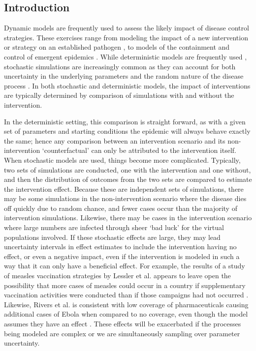 \documentclass[PTRSB]{rsos}
\begin{document}
\begin{multicols}{2}
\section{Introduction}
Dynamic models are frequently used to assess the likely impact of disease control strategies.
These exercises range from modeling the impact of a new intervention or strategy on an established pathogen \cite{azman-et-al:2016}, to models of the containment and control of emergent epidemics \cite{lessler-et-al:2016}.
While deterministic models are frequently used \cite{fraser-et-al:2004}, stochastic simulations are increasingly common as they can account for both uncertainty in the underlying parameters and the random nature of the disease process \cite{ferguson-et-al:2003}.
In both stochastic and deterministic models, the impact of interventions are typically determined by comparison of simulations with and without the intervention.

In the deterministic setting, this comparison is straight forward, as with a given set of parameters and starting conditions the epidemic will always behave exactly the same; hence any comparison between an intervention scenario and its non-intervention `counterfactual' can only be attributed to the intervention itself.
When stochastic models are used, things become more complicated.
Typically, two sets of simulations are conducted, one with the intervention and one without, and then the distribution of outcomes from the two sets are compared to estimate the intervention effect.
Because these are independent sets of simulations, there may be some simulations in the non-intervention scenario where the disease dies off quickly due to random chance, and fewer cases occur than the majority of intervention simulations.
Likewise, there may be cases in the intervention scenario where large numbers are infected through sheer `bad luck' for the virtual populations involved.
If these stochastic effects are large, they may lead uncertainty intervals in effect estimates to include the intervention having no effect, or even a negative impact, even if the intervention is modeled in such a way that it can only have a beneficial effect.
For example, the results of a study of measles vaccination strategies by Lessler et al. appears to leave open the possibility that more cases of measles could occur in a country if supplementary vaccination activities were conducted than if those campaigns had not occurred \cite{lessler-et-al:2016}.
Likewise, Rivers et al. is consistent with low coverage of pharmaceuticals causing additional cases of Ebola when compared to no coverage, even though the model assumes they have an effect \cite{rivers-et-al:2014}.
These effects will be exacerbated if the processes being modeled are complex or we are simultaneously sampling over parameter uncertainty.


\end{multicols}
\end{document}

